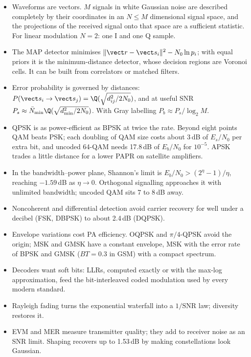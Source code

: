\begin{itemize}
\item Waveforms are vectors. $M$ signals in white Gaussian noise are described completely by their
coordinates in an $N\le M$ dimensional signal space, and the projections of the received signal onto
that space are a sufficient statistic. For linear modulation $N=2$: one I and one Q sample.
\item The MAP detector minimises $\|\vect r-\vect s_i\|^2-N_0\ln p_i$; with equal priors it is the
minimum-distance detector, whose decision regions are Voronoi cells. It can be built from
correlators or matched filters.
\item Error probability is governed by distances: $P(\vect s_i\to\vect s_j)=\Q(\sqrt{d_{ij}^2/2N_0})$,
and at useful SNR $P_s\approx\bar N_{\min}\Q(\sqrt{d_{\min}^2/2N_0})$. With Gray labelling
$P_b\approx P_s/\log_2M$.
\item QPSK is as power-efficient as BPSK at twice the rate. Beyond eight points QAM beats PSK; each
doubling of QAM size costs about 3\,dB of $E_s/N_0$ per extra bit, and uncoded 64-QAM needs 17.8\,dB
of $E_b/N_0$ for $10^{-5}$. APSK trades a little distance for a lower PAPR on satellite amplifiers.
\item In the bandwidth--power plane, Shannon's limit is $E_b/N_0>(2^\eta-1)/\eta$, reaching $-1.59$\,dB
as $\eta\to0$. Orthogonal signalling approaches it with unlimited bandwidth; uncoded QAM sits 7 to
8\,dB away.
\item Noncoherent and differential detection avoid carrier recovery for well under a decibel (FSK,
DBPSK) to about 2.4\,dB (DQPSK).
\item Envelope variations cost PA efficiency. OQPSK and $\pi/4$-QPSK avoid the origin; MSK and GMSK
have a constant envelope, MSK with the error rate of BPSK and GMSK ($BT=0.3$ in GSM) with a compact
spectrum.
\item Decoders want soft bits: LLRs, computed exactly or with the max-log approximation, feed the
bit-interleaved coded modulation used by every modern standard.
\item Rayleigh fading turns the exponential waterfall into a $1/\mathrm{SNR}$ law; diversity restores it.
\item EVM and MER measure transmitter quality; they add to receiver noise as an SNR limit. Shaping
recovers up to 1.53\,dB by making constellations look Gaussian.
\end{itemize}

